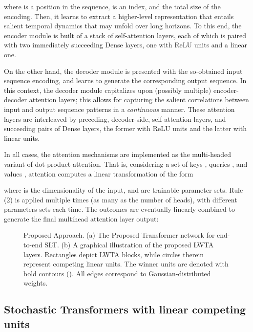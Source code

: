 \documentclass[10pt,twocolumn,letterpaper]{article}
\begin{document}
where  is a position in the sequence,  is an index, and  the total size of the encoding. Then, it learns to extract a higher-level representation that entails salient temporal dynamics that may unfold over long horizons. To this end, the encoder module is built of a stack of self-attention layers, each of which is paired with two immediately succeeding Dense layers, one with ReLU units and a linear one.

On the other hand, the decoder module is presented with the so-obtained input sequence encoding, and learns to generate the corresponding output sequence. In this context, the decoder module capitalizes upon (possibly multiple) encoder-decoder attention layers; this allows for capturing the salient correlations between input and output sequence patterns in a \emph{continuous} manner. These attention layers are interleaved by preceding, decoder-side, self-attention layers, and succeeding pairs of Dense layers, the former with ReLU units and the latter with linear units. 

In all cases, the attention mechanisms are implemented as the multi-headed variant of dot-product attention. That is, considering a set of keys , queries , and values , attention computes a linear transformation of the form 

where  is the dimensionality of the input, and  are trainable parameter sets. Rule (2) is applied multiple times (as many as the number of heads), with different parameters sets each time. The outcomes are eventually linearly combined to generate the final multihead attention layer output:




\begin{figure*}\centering
    \hspace{-5mm}
     \qquad
   \qquad
    \caption{ Proposed Approach. (a) The Proposed Transformer network for end-to-end SLT. (b) A graphical illustration of the proposed LWTA layers. Rectangles depict LWTA blocks, while circles therein represent competing linear units. The winner units are denoted with bold contours (). All edges correspond to Gaussian-distributed weights.} \label{fig:fullmodel}\end{figure*}


\subsection{Stochastic Transformers with linear competing units}
\end{document}
